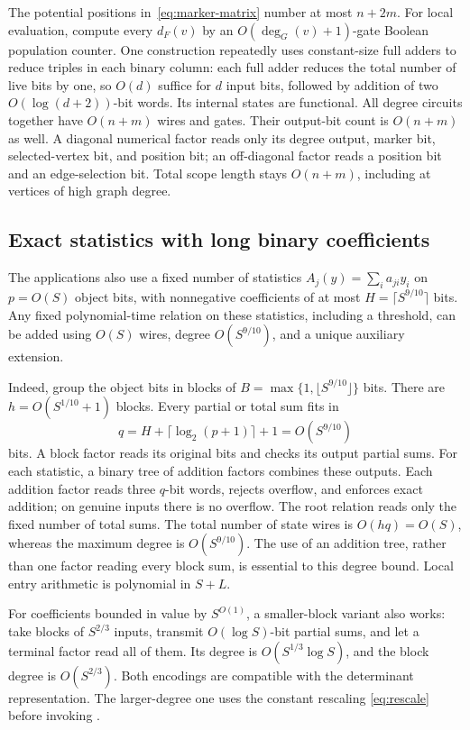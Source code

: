 The potential positions in~\eqref{eq:marker-matrix} number at most
$n+2m$. For local evaluation, compute every $d_F(v)$ by an
$O(\deg_G(v)+1)$-gate Boolean population counter. One construction
repeatedly uses constant-size full adders to reduce triples in each
binary column: each full adder reduces the total number of live bits
by one, so $O(d)$ suffice for $d$ input bits, followed by addition
of two $O(\log(d+2))$-bit words. Its internal states are functional.
All degree circuits together have $O(n+m)$ wires and gates.
Their output-bit count is $O(n+m)$ as well. A diagonal numerical
factor reads only its degree output, marker bit, selected-vertex bit,
and position bit; an off-diagonal factor reads a position bit and an
edge-selection bit. Total scope length stays $O(n+m)$, including at
vertices of high graph degree.

\subsection{Exact statistics with long binary coefficients}
\label{subsec:weights}

The applications also use a fixed number of statistics
$A_j(y)=\sum_i a_{ji}y_i$ on $p=O(S)$ object bits, with nonnegative
coefficients of at most $H=\lceil S^{9/10}\rceil$ bits. Any fixed
polynomial-time relation on these statistics, including a threshold,
can be added using $O(S)$ wires, degree $O(S^{9/10})$, and a unique
auxiliary extension.

Indeed, group the object bits in blocks of
$B=\max\{1,\lfloor S^{9/10}\rfloor\}$ bits. There are
$h=O(S^{1/10}+1)$ blocks. Every partial or total sum fits in
\[
 q=H+\lceil\log_2(p+1)\rceil+1=O(S^{9/10})
\]
bits. A block factor reads its original bits and checks its output
partial sums. For each statistic, a binary tree of addition factors
combines these outputs. Each addition factor reads three $q$-bit
words, rejects overflow, and enforces exact addition; on genuine
inputs there is no overflow. The root relation reads only the fixed
number of total sums. The total number of state wires is $O(hq)=O(S)$,
whereas the maximum degree is $O(S^{9/10})$. The use of an addition
tree, rather than one factor reading every block sum, is essential to
this degree bound. Local entry arithmetic is polynomial in $S+L$.

For coefficients bounded in value by $S^{O(1)}$, a smaller-block
variant also works: take blocks of $S^{2/3}$ inputs, transmit
$O(\log S)$-bit partial sums, and let a terminal factor read all of
them. Its degree is $O(S^{1/3}\log S)$, and the block degree is
$O(S^{2/3})$. Both encodings are compatible with the determinant
representation. The larger-degree one uses the constant rescaling
\eqref{eq:rescale} before invoking \HTC.
